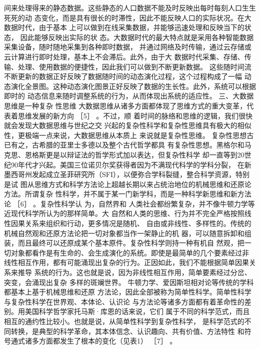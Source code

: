 \documentclass[11pt]{ctexart}
\begin{document}
{{{{间来处理得来的静态数据。这些静态的人口数据不能及时反映出每时每刻人口生生死死的动
态变化，而是具有很长的时滞性，因此不能反映人口的实际状况。在大数据时代，由于基本
上可以做到在线采集数据，并能够迅速处理和反映当下的状态， 因此能够反映出实际的状
态。大数据时代的最大特点就是采用各种智能数据采集设备，随时随地采集到各种即时数据，
并通过网络及时传输，通过云存储或云计算进行即时处理，基本上不会滞后。此外，由于大
数据时代采集、存储、传输、处理、使用数据的便捷性，因此我们可以做到不断更新数据。
这些随时间流不断更新的数据正好反映了数据随时间的动态演化过程，这个过程构成了一幅
动态演化全景图。这种动态演化图景正好反映了数据的生长性。此外，系统可以根据即时的
动态信息来随时调整系统的行为，从而体现出系统的适应性。 三、大数据思维是一种复杂
性思维 大数据思维从诸多方面都体现了思维方式的重大变革，代表着思维发展的新方向
［5］ 。不过，顺 着时间的脉络和思维的逻辑，我们很快就会发现大数据思维与世纪之交
兴起的复杂性科学和复杂性思维具有极大的相似性，更极端一点来说，大数据思维从本质上
来说就是复杂性思维。 复杂性思想古已有之，古希腊的亚里士多德以及整个古代哲学都具
有复杂性思想。黑格尔和马克思、恩格斯更是以辩证法的哲学形式加以表达，但复杂性科学
却一直等到20世纪90年代才兴起。美国三位诺贝尔奖获得者因为不满现代科学的学科分裂，
在新墨西哥州发起成立圣菲研究所（SFI），以便弥合学科裂缝，整合科学资源，特别是试
图从思维方式和科学方法论上超越长期以来占统治地位的机械思维和还原论方法。所谓复杂
性科学，并不属于某一门新学科，而是一种科学新思维和新方法论 ［6］ 。复杂性科学认
为，自然界和 人类社会都纷繁复杂，并不像牛顿力学等近现代科学所认为的那样简单。大
自然和人类的思维、行为并不完全严格按照线性因果关系来组织和行动，更多情况是随机、
自由或非线性、多样性的。传统的机械自然观和还原方法论把一切对象都当作一架静止的机
器，可以随意拆卸和组装，而且最终可以还原成某个基本原件。复杂性科学则持一种有机自
然观，把一切对象都看作是有生命的、会生成演化的系统。即使是最简单的几个要素经过非
线性相互作用，都有可能涌现出复杂的行为。正因如此，我们不能根据简单因果关系来推导
系统的行为。这也就是说，因为非线性相互作用，简单要素经过分岔、突变，会涌现出复杂
多样的斑斓世界。 牛顿力学、爱因斯坦相对论等传统的学科都基本上基于机械思维和还原
方法论，因此全部被称为简单性科学。简单性科学与复杂性科学在世界观、本体论、认识论
与方法论等诸多方面都有着革命性的差别。用美国科学哲学家托马斯·库恩的话来说，它们
属于不同的科学范式，而且相互的通约性比较小。也就是说，从简单性科学到复杂性科学，
是科学范式的不同转换，是典型的科学革命，其本体信念、认识趣向、共有价值、方法特性
和符号通式诸多方面都发生了根本的变化（见表1） ［7］ 。


}}}}
\end{document}
